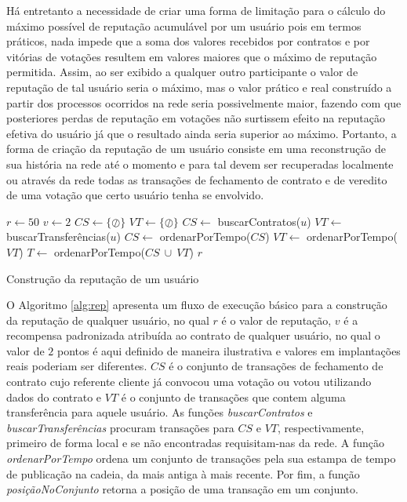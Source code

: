 Há entretanto a necessidade de criar uma forma de limitação para o cálculo do máximo possível de reputação acumulável por um usuário pois em termos práticos, nada impede que a soma dos valores recebidos por contratos e por vitórias de votações resultem em valores maiores que o máximo de reputação permitida. Assim, ao ser exibido a qualquer outro participante o valor de reputação de tal usuário seria o máximo, mas o valor prático e real construído a partir dos processos ocorridos na rede seria possivelmente maior, fazendo com que posteriores perdas de reputação em votações não surtissem efeito na reputação efetiva do usuário já que o resultado ainda seria superior ao máximo. Portanto, a forma de criação da reputação de um usuário consiste em uma reconstrução de sua história na rede até o momento e para tal devem ser recuperadas localmente ou através da rede todas as transações de fechamento de contrato e de veredito de uma votação que certo usuário tenha se envolvido.

\begin{algorithm}[h]
 $r \gets 50$\;
 $v \gets 2$\;
 $CS \gets \{\oslash\}$\;
 $VT \gets \{\oslash\}$\;
 $CS \gets$ buscarContratos($u$)\;
 $VT \gets$ buscarTransferências($u$)\;
 $CS \gets$ ordenarPorTempo($CS$)\;
 $VT \gets$ ordenarPorTempo($VT$)\;
 $T \gets$ ordenarPorTempo($CS\ \cup\ VT$)\;
 \Retorna $r$
 \caption{Construção da reputação de um usuário}
 \label{alg:rep}
\end{algorithm}

O Algoritmo \ref{alg:rep} apresenta um fluxo de execução básico para a construção da reputação de qualquer usuário, no qual $r$ é o valor de reputação, $v$ é a recompensa padronizada atribuída ao contrato de qualquer usuário, no qual o valor de $2$ pontos é aqui definido de maneira ilustrativa e valores em implantações reais poderiam ser diferentes. $CS$ é o conjunto de transações de fechamento de contrato cujo referente cliente já convocou uma votação ou votou utilizando dados do contrato e $VT$ é o conjunto de transações que contem alguma transferência para aquele usuário. As funções \textit{buscarContratos} e \textit{buscarTransferências} procuram transações para $CS$ e $VT$, respectivamente, primeiro de forma local e se não encontradas requisitam-nas da rede. A função \textit{ordenarPorTempo} ordena um conjunto de transações pela sua estampa de tempo de publicação na cadeia, da mais antiga à mais recente. Por fim, a função \textit{posiçãoNoConjunto} retorna a posição de uma transação em um conjunto.

